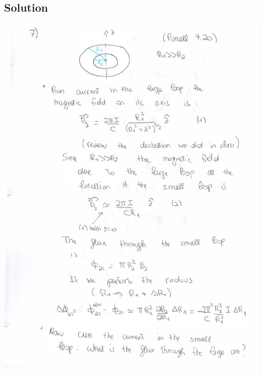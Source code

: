 \documentclass[solutions]{esg8022pset}
\begin{document}
\subsection{Solution}
  \begin{center}
    \includegraphics[width = \textwidth, height = 0.9\textheight, keepaspectratio]{ps9_7a}
    \clearpage

\end{center}
\end{document}
